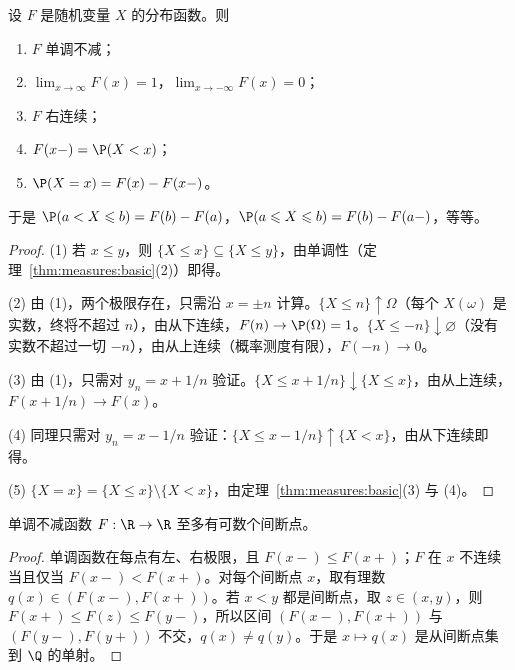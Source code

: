 \begin{theorem}[分布函数的性质]\label{thm:distributions:df-properties}
设 $F$ 是随机变量 $X$ 的分布函数。则
\begin{enumerate}
\item $F$ 单调不减；
\item $\lim_{x\to\infty}F(x)=1$，$\lim_{x\to-\infty}F(x)=0$；
\item $F$ 右连续；
\item $F(x-)=\P(X<x)$；
\item $\P(X=x)=F(x)-F(x-)$。
\end{enumerate}
于是 $\P(a<X\leqslant b)=F(b)-F(a)$，$\P(a\leqslant X\leqslant b)=F(b)-F(a-)$，等等。
\end{theorem}
\begin{proof}
(1) 若 $x\leqslant y$，则 $\{X\leqslant x\}\subseteq\{X\leqslant y\}$，由单调性（定理~\ref{thm:measures:basic}(2)）即得。

(2) 由 (1)，两个极限存在，只需沿 $x=\pm n$ 计算。$\{X\leqslant n\}\uparrow\Omega$（每个 $X(\omega)$ 是实数，终将不超过 $n$），由从下连续，$F(n)\to \P(\Omega)=1$。$\{X\leqslant-n\}\downarrow\varnothing$（没有实数不超过一切 $-n$），由从上连续（概率测度有限），$F(-n)\to0$。

(3) 由 (1)，只需对 $y_n=x+1/n$ 验证。$\{X\leqslant x+1/n\}\downarrow\{X\leqslant x\}$，由从上连续，$F(x+1/n)\to F(x)$。

(4) 同理只需对 $y_n=x-1/n$ 验证：$\{X\leqslant x-1/n\}\uparrow\{X<x\}$，由从下连续即得。

(5) $\{X=x\}=\{X\leqslant x\}\setminus\{X<x\}$，由定理~\ref{thm:measures:basic}(3) 与 (4)。
\end{proof}

\begin{proposition}\label{prop:distributions:jumps}
单调不减函数 $F:\R\to\R$ 至多有可数个间断点。
\end{proposition}
\begin{proof}
单调函数在每点有左、右极限，且 $F(x-)\leqslant F(x+)$；$F$ 在 $x$ 不连续当且仅当 $F(x-)<F(x+)$。对每个间断点 $x$，取有理数 $q(x)\in(F(x-),F(x+))$。若 $x<y$ 都是间断点，取 $z\in(x,y)$，则 $F(x+)\leqslant F(z)\leqslant F(y-)$，所以区间 $(F(x-),F(x+))$ 与 $(F(y-),F(y+))$ 不交，$q(x)\neq q(y)$。于是 $x\mapsto q(x)$ 是从间断点集到 $\Q$ 的单射。
\end{proof}

